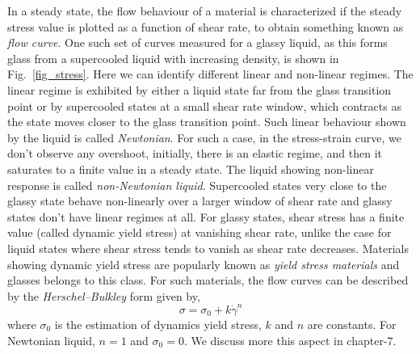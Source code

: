     In a steady state, the flow behaviour of a material is characterized if the steady stress value is plotted as a function of shear rate, to obtain something known as {\em flow curve}. One such set of curves measured for a glassy liquid, as this forms glass from a supercooled liquid with increasing density, is shown in Fig.~\ref{fig_stress}. Here we can identify different linear and non-linear regimes. The linear regime is exhibited by either a liquid state far from the glass transition point or by supercooled states at a small shear rate window, which contracts as the state moves closer to the glass transition point. Such linear behaviour shown by the liquid is called {\em Newtonian}. For such a case, in the stress-strain curve, we don't observe any overshoot, initially, there is an elastic regime, and then it saturates to a finite value in a steady state. The liquid showing non-linear response is called {\em non-Newtonian liquid}. Supercooled states very close to the glassy state behave non-linearly over a larger window of shear rate and glassy states don't have linear regimes at all. For glassy states, shear stress has a finite value (called dynamic yield stress) at vanishing shear rate, unlike the case for liquid states  where shear stress tends to vanish as shear rate decreases. Materials showing dynamic yield stress are popularly known as {\em yield stress materials} and glasses belongs to this class. For such materials, the flow curves can be described by the {\em Herschel–Bulkley} form given by,
    \begin{equation}
        \sigma = \sigma_0 + k \dot{\gamma}^n
    \end{equation}
    where $\sigma_0$ is the estimation of dynamics yield stress, $k$ and $n$ are constants. For Newtonian liquid, $n=1$ and $\sigma_0 = 0$. We discuss more this aspect in chapter-7.
    
